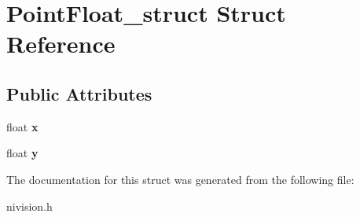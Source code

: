\hypertarget{structPointFloat__struct}{\section{\-Point\-Float\-\_\-struct \-Struct \-Reference}
\label{structPointFloat__struct}
}
\subsection*{\-Public \-Attributes}
\begin{DoxyCompactItemize}
\item 
\hypertarget{structPointFloat__struct_af2f34d4c4169f4ea6808b317ad629233}{float {\bfseries x}}\label{structPointFloat__struct_af2f34d4c4169f4ea6808b317ad629233}

\item 
\hypertarget{structPointFloat__struct_a68233d3025b5283fc273c0ebe1b712a4}{float {\bfseries y}}\label{structPointFloat__struct_a68233d3025b5283fc273c0ebe1b712a4}

\end{DoxyCompactItemize}


\-The documentation for this struct was generated from the following file\-:\begin{DoxyCompactItemize}
\item 
nivision.\-h\end{DoxyCompactItemize}
